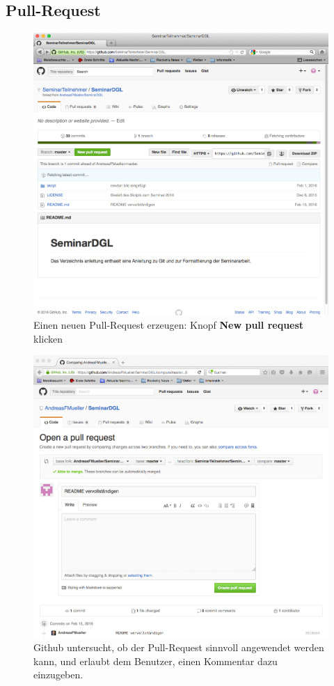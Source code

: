 \documentclass[a4paper,12pt]{article}
\begin{document}
\subsection{Pull-Request}
\begin{figure}
\centering
\includegraphics[width=\hsize]{newpullreqest.png}
\caption{Einen neuen Pull-Request erzeugen: Knopf {\bf New pull request}
klicken
\label{newpullrequest}}
\end{figure}
\begin{figure}
\centering
\includegraphics[width=\hsize]{openpull.png}
\caption{Github untersucht, ob der Pull-Request sinnvoll angewendet
werden kann, und erlaubt dem Benutzer, einen Kommentar dazu einzugeben.
\label{openpull}}
\end{figure}
\end{document}
